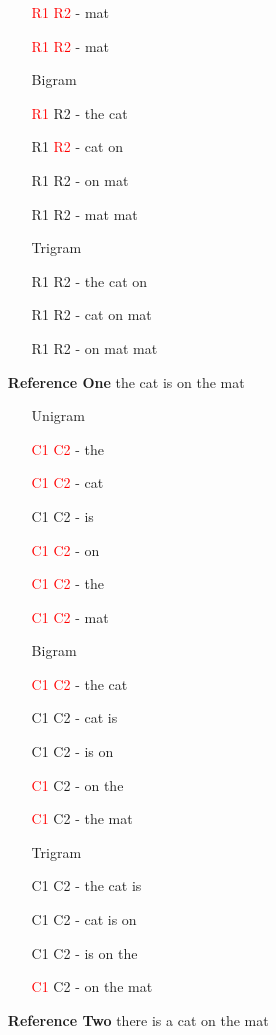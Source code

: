 \begin{multicols}{2}
\begin{itemize}
\begin{itemize}
			\item[\textcolor{red}{R1} \textcolor{red}{R2} -]	mat 
			\item[\textcolor{red}{R1} \textcolor{red}{R2} -]	mat
			\item [Bigram]
			\item[\textcolor{red}{R1} R2 -]	the cat 
			\item[R1 \textcolor{red}{R2} -]	cat on 
			\item[R1 R2 -]	on mat 
			\item[R1 R2 -]	mat mat
			\item [Trigram] 
			\item[R1 R2 -]	the cat on
			\item[R1 R2 -]	cat on mat
			\item[R1 R2 -]	on mat mat
		\end{itemize}
\columnbreak
	\item	[\textbf{Reference One}] the cat is on the mat
		\begin{itemize}
		\setlength\itemsep{.001cm}
			\item [Unigram]
			\item[\textcolor{red}{C1} \textcolor{red}{C2} -]	 the 
			\item[\textcolor{red}{C1} \textcolor{red}{C2} -]	 cat 
			\item[C1 C2 -]	 is 
			\item[\textcolor{red}{C1} \textcolor{red}{C2} -]	 on 
			\item[\textcolor{red}{C1} \textcolor{red}{C2} -]	 the 
			\item[\textcolor{red}{C1} \textcolor{red}{C2} -]	 mat
			\item [Bigram]
			\item[\textcolor{red}{C1} \textcolor{red}{C2} -]	 the cat 
			\item[C1 C2 -]	 cat is 
			\item[C1 C2 -]	 is on 
			\item[\textcolor{red}{C1} C2 -]	 on the 
			\item[\textcolor{red}{C1} C2 -] the mat
			\item [Trigram] 
			\item[C1 C2 -]	the cat is
			\item[C1 C2 -]	cat is on
			\item[C1 C2 -]	is on the
			\item[\textcolor{red}{C1} C2 -]	on the mat
		\end{itemize}
	\item	[\textbf{Reference Two}] there is a cat on the mat

\end{itemize}
\end{multicols}
